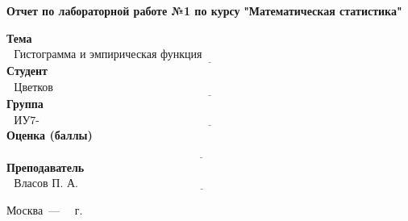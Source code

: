\begin{titlepage}
	\begin{center}
		\noindent\begin{minipage}{1.3\textwidth}\centering
		\Large\textbf{Отчет по лабораторной работе №1 по курсу}\newline
		\textbf{"Математическая статистика"}\newline\newline\newline
		\end{minipage}
	\end{center}
	

	\noindent\textbf{Тема}           $\underline{\text{~~Гистограмма и эмпирическая функция распределения~~~~~~~~~~~~~~~~~~~~~~~~~~~~~~~~~~~~~~~~~~~}}$\newline\newline
	\noindent\textbf{Студент}        $\underline{\text{~~Цветков И.А.~~~~~~~~~~~~~~~~~~~~~~~~~~~~~~~~~~~~~~~~~~~~~~~~~~~~~~~~~~~~~~~~~~~~~~~~~~~~~~~~~~~~~~~~~~~~~~~}}$\newline\newline
	\noindent\textbf{Группа}         $\underline{\text{~~ИУ7-63Б~~~~~~~~~~~~~~~~~~~~~~~~~~~~~~~~~~~~~~~~~~~~~~~~~~~~~~~~~~~~~~~~~~~~~~~~~~~~~~~~~~~~~~~~~~~~~~~~~~~~~~}}$\newline\newline
	\noindent\textbf{Оценка (баллы)} $\underline{\text{~~~~~~~~~~~~~~~~~~~~~~~~~~~~~~~~~~~~~~~~~~~~~~~~~~~~~~~~~~~~~~~~~~~~~~~~~~~~~~~~~~~~~~~~~~~~~~~~~~~~~~~~}}$\newline\newline
	\noindent\textbf{Преподаватель}  $\underline{\text{~~Власов П. А.~~~~~~~~~~~~~~~~~~~~~~~~~~~~~~~~~~~~~~~~~~~~~~~~~~~~~~~~~~~~~~~~~~~~~~~~~~~~~~~~~~~~~}}$\newline	
	\begin{center}
		\vfill
		Москва~---~\the\year
		~г.
	\end{center}
	\restoregeometry
\end{titlepage}

